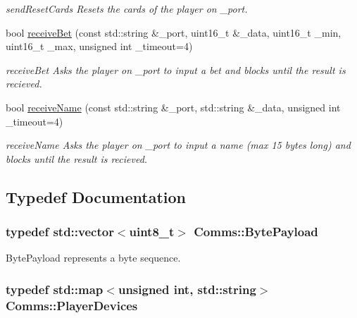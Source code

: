 \begin{DoxyCompactItemize}
\begin{DoxyCompactList}\small\item\em send\-Reset\-Cards Resets the cards of the player on \-\_\-port. \end{DoxyCompactList}\item 
bool \hyperlink{namespaceComms_a89d7a587eb06b38621bc16c99ae0ede6}{receive\-Bet} (const std\-::string \&\-\_\-port, uint16\-\_\-t \&\-\_\-data, uint16\-\_\-t \-\_\-min, uint16\-\_\-t \-\_\-max, unsigned int \-\_\-timeout=4)
\begin{DoxyCompactList}\small\item\em receive\-Bet Asks the player on \-\_\-port to input a bet and blocks until the result is recieved. \end{DoxyCompactList}\item 
bool \hyperlink{namespaceComms_a70a2eabc41885572c59dfd6fb6dffc9d}{receive\-Name} (const std\-::string \&\-\_\-port, std\-::string \&\-\_\-data, unsigned int \-\_\-timeout=4)
\begin{DoxyCompactList}\small\item\em receive\-Name Asks the player on \-\_\-port to input a name (max 15 bytes long) and blocks until the result is recieved. \end{DoxyCompactList}\end{DoxyCompactItemize}


\subsection{Typedef Documentation}
\hypertarget{namespaceComms_ada8b41d9f3f987d621ee196a4a760238}{
\subsubsection[{Byte\-Payload}]{\setlength{\rightskip}{0pt plus 5cm}typedef std\-::vector$<$uint8\-\_\-t$>$ {\bf Comms\-::\-Byte\-Payload}}}\label{namespaceComms_ada8b41d9f3f987d621ee196a4a760238}


Byte\-Payload represents a byte sequence. 

\hypertarget{namespaceComms_ae7f8ecf87c32fe890069143ff75f2885}{
\subsubsection[{Player\-Devices}]{\setlength{\rightskip}{0pt plus 5cm}typedef std\-::map$<$unsigned int, std\-::string$>$ {\bf Comms\-::\-Player\-Devices}}}\label{namespaceComms_ae7f8ecf87c32fe890069143ff75f2885}


